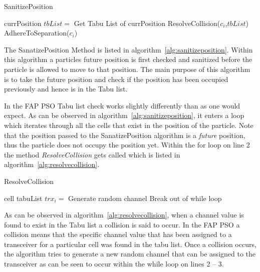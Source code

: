 \begin{algorithm}
\caption{SanitizePosition}
\label{alg:sanitizeposition}
\begin{algorithmic}[1]
	\REQUIRE currPosition
		\STATE $tbList = $ Get Tabu List of currPosition
		\STATE ResolveCollision($c_i$,$tbList$)
		\STATE AdhereToSeparation($c_i$)
	\ENDFOR
\end{algorithmic}
\end{algorithm}

The SanatizePosition Method is listed in algorithm~\ref{alg:sanitizeposition}. Within this algorithm a particles future position is first checked and sanitized before the particle is allowed to move to that position. The main purpose of this algorithm is to take the future position and check if the position has been occupied previously and hence is in the Tabu list.

In the FAP PSO Tabu list check works slightly differently than as one would expect. As can be observed in algorithm~\ref{alg:sanitizeposition}, it enters a loop which iterates through all the cells that exist in the position of the particle. Note that the position passed to the SanatizePosition algorithm is a \emph{future} position, thus the particle does not occupy the position yet. Within the for loop on line 2 the method \emph{ResolveCollision} gets called which is listed in algorithm~\ref{alg:resolvecollision}.

\begin{algorithm}
\caption{ResolveCollision}
\label{alg:resolvecollision}
\begin{algorithmic}[1]
	\REQUIRE cell
	\REQUIRE tabuList
				\STATE $trx_i = $ Generate random channel
					\STATE Break out of while loop
				\ENDIF
			\ENDWHILE
	\ENDFOR
\end{algorithmic}
\end{algorithm}

As can be observed in algorithm~\ref{alg:resolvecollision}, when a channel value is found to exist in the Tabu list a collision is said to occur. In the FAP PSO a collision means that the specific channel value that has been assigned to a transceiver for a particular cell was found in the tabu list. Once a collision occurs, the algorithm tries to generate a new random channel that can be assigned to the transceiver as can be seen to occur within the while loop on lines 2 -- 3.

